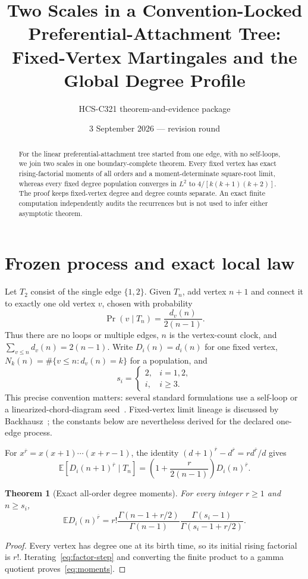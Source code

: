 \documentclass[9pt]{extarticle}
\title{Two Scales in a Convention-Locked Preferential-Attachment Tree:\\Fixed-Vertex Martingales and the Global Degree Profile}
\author{HCS-C321 theorem-and-evidence package}
\date{3 September 2026 --- revision round \CRevisionRound}
\newtheorem{theorem}{Theorem}
\newcommand{\E}{\mathbb E}
\newcommand{\1}{\mathbf 1}
\begin{document}
\maketitle
\begin{abstract}
For the linear preferential-attachment tree started from one edge, with no
self-loops, we join two scales in one boundary-complete theorem.  Every fixed
vertex has exact rising-factorial moments of all orders and a
moment-determinate square-root limit, whereas every fixed degree population
converges in $L^2$ to $4/[k(k+1)(k+2)]$.  The proof keeps fixed-vertex degree
and degree counts separate.  An exact finite computation independently audits
the recurrences but is not used to infer either asymptotic theorem.
\end{abstract}

\section{Frozen process and exact local law}
Let $T_2$ consist of the single edge $\{1,2\}$.  Given $T_n$, add vertex
$n+1$ and connect it to exactly one old vertex $v$, chosen with probability
\[
 \Pr(v\mid T_n)=\frac{d_v(n)}{2(n-1)}.
\]
Thus there are no loops or multiple edges, $n$ is the vertex-count clock, and
$\sum_{v\leq n}d_v(n)=2(n-1)$.  Write $D_i(n)=d_i(n)$ for one fixed vertex,
$N_k(n)=\#\{v\leq n:d_v(n)=k\}$ for a population, and
\[
 s_i=\begin{cases}2,&i=1,2,\\i,&i\geq3.\end{cases}
\]
This precise convention matters: several standard formulations use a
self-loop or a linearized-chord-diagram seed~\cite{ba,bollobas}.  Fixed-vertex
limit lineage is discussed by Backhausz~\cite{backhausz}; the constants below
are nevertheless derived for the declared one-edge process.

For $x^{\overline r}=x(x+1)\cdots(x+r-1)$, the identity
$(d+1)^{\overline r}-d^{\overline r}=r d^{\overline r}/d$ gives
\begin{equation}\label{eq:factor-step}
 \E[D_i(n+1)^{\overline r}\mid T_n]
 =\left(1+\frac{r}{2(n-1)}\right)D_i(n)^{\overline r}.
\end{equation}

\begin{theorem}[Exact all-order degree moments]\label{thm:moments}
For every integer $r\geq1$ and $n\geq s_i$,
\begin{equation}\label{eq:moments}
 \E D_i(n)^{\overline r}
 =r!\frac{\Gamma(n-1+r/2)}{\Gamma(n-1)}
 \frac{\Gamma(s_i-1)}{\Gamma(s_i-1+r/2)}.
\end{equation}
\end{theorem}
\begin{proof}
Every vertex has degree one at its birth time, so its initial rising factorial
is $r!$.  Iterating~\eqref{eq:factor-step} and converting the finite product to
a gamma quotient proves~\eqref{eq:moments}.
\end{proof}
\end{document}
